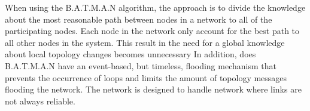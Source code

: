 When using the B.A.T.M.A.N algorithm, the approach is to divide the knowledge about the most reasonable path between nodes in a network to all of the participating nodes.
Each node in the network only account for the best path to all other nodes in the system.
This result in the need for a global knowledge about local topology changes becomes unnecessary
In addition, does B.A.T.M.A.N have an event-based, but timeless, flooding mechanism that prevents the occurrence of loops and limits the amount of topology messages flooding the network.
The network is designed to handle network where links are not always reliable.
